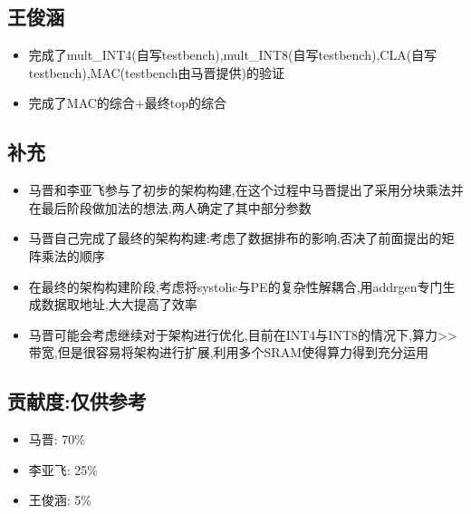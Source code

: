 \documentclass[zihao=-4, UTF8]{ctexart}
\begin{document}
\subsection{王俊涵}
\begin{itemize}
    \item 完成了mult\_INT4(自写testbench),mult\_INT8(自写testbench),CLA(自写testbench),MAC(testbench由马晋提供)的验证
    \item 完成了MAC的综合+最终top的综合
\end{itemize}
\subsection{补充}
\begin{itemize}
    \item 马晋和李亚飞参与了初步的架构构建,在这个过程中马晋提出了采用分块乘法并在最后阶段做加法的想法,两人确定了其中部分参数
    \item 马晋自己完成了最终的架构构建:考虑了数据排布的影响,否决了前面提出的矩阵乘法的顺序
    \item 在最终的架构构建阶段,考虑将systolic与PE的复杂性解耦合,用addrgen专门生成数据取地址,大大提高了效率
    \item 马晋可能会考虑继续对于架构进行优化,目前在INT4与INT8的情况下,算力>>带宽,但是很容易将架构进行扩展,利用多个SRAM使得算力得到充分运用
\end{itemize}
\subsection{贡献度:仅供参考}
\begin{itemize}
    \item 马晋: 70\%
    \item 李亚飞: 25\%
    \item 王俊涵: 5\%
\end{itemize}
\end{document}
